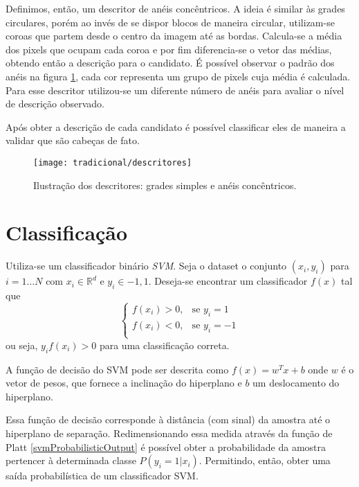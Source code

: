 Definimos, então, um descritor de anéis concêntricos. A ideia é similar às grades circulares, porém ao invés de se dispor blocos de maneira circular, utilizam-se coroas que partem desde o centro da imagem até as bordas. Calcula-se a média dos pixels que ocupam cada coroa e por fim diferencia-se o vetor das médias, obtendo então a descrição para o candidato. É possível observar o padrão dos anéis na figura \ref{fig:descritores}, cada cor representa um grupo de pixels cuja média é calculada. Para esse descritor utilizou-se um diferente número de anéis para avaliar o nível de descrição observado.

Após obter a descrição de cada candidato é possível classificar eles de maneira a validar que são cabeças de fato.

\begin{figure}[h]
\centering
\texttt{[image: tradicional/descritores]}
\caption{Ilustração dos descritores: grades simples e anéis concêntricos.}
\label{fig:descritores}
\end{figure}

\section{Classificação}
\label{sec:classificacao:svm}

Utiliza-se um classificador binário \textit{SVM}. Seja o dataset o conjunto $(x_i, y_i)$ para $i=1 \dots N$ com $x_i \in \mathbb{R}^d$ e $y_i \in {-1, 1}$. Deseja-se encontrar um classificador $f(x)$ tal que 
\begin{equation*}
	\begin{cases}
		f(x_i)>0,& \text{se } y_i=1 \\
		f(x_i)<0,& \text{se } y_i=-1 \\
	\end{cases}
\end{equation*}
 ou seja, $y_i f(x_i) > 0$ para uma classificação correta.

A função de decisão do SVM pode ser descrita como $f(x)=w^T x+ b$ onde $w$ é o vetor de pesos, que fornece a inclinação do hiperplano e $b$ um deslocamento do hiperplano.

Essa função de decisão corresponde à distância (com sinal) da amostra até o hiperplano de separação. Redimensionando essa medida através da função de Platt \ref{svmProbabilisticOutput} é possível obter a probabilidade da amostra pertencer à determinada classe $P(y_i=1 | x_i)$. Permitindo, então, obter uma saída probabilística de um classificador SVM.

